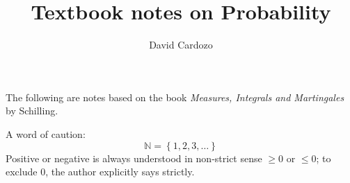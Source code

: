 \documentclass[notitlepage]{report}
\author{David Cardozo}
\title{Textbook notes on Probability}
\newcommand{\NN}{\mathbb{N}}
\newcommand{\set}[1]{\left\lbrace #1 \right\rbrace}
\begin{document}
\maketitle
The following are notes based on the book \textit{Measures, Integrals and Martingales} by Schilling.

A word of caution:
\[ \NN = \set{1,2,3, \ldots}  \]
Positive or negative is always understood in non-strict sense $ \geq 0 $ or $ \leq 0 $; to exclude $0$, the author explicitly says strictly.


\end{document}
